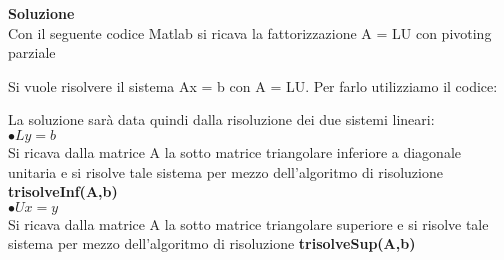 \large\noindent{}
\begin{flushleft}
	\large \textbf{Soluzione}\\[0.5cm]
	Con il seguente codice Matlab si ricava la fattorizzazione A = LU con pivoting parziale
	
	Si vuole risolvere il sistema Ax = b con A = LU. Per farlo utilizziamo il codice:
	
	La soluzione sarà data quindi dalla risoluzione dei due sistemi lineari:\\[0.3cm]
	$\bullet Ly = b$\\[0.1cm]
	Si ricava dalla matrice A la sotto matrice triangolare inferiore a diagonale unitaria e si risolve tale sistema per mezzo dell'algoritmo di risoluzione \textbf{trisolveInf(A,b)}\\[0.3cm]
	$\bullet Ux = y$\\[0.1cm]
	Si ricava dalla matrice A la sotto matrice triangolare superiore e si risolve tale sistema per mezzo dell'algoritmo di risoluzione \textbf{trisolveSup(A,b)}\\[0.3cm]
	\end{flushleft}